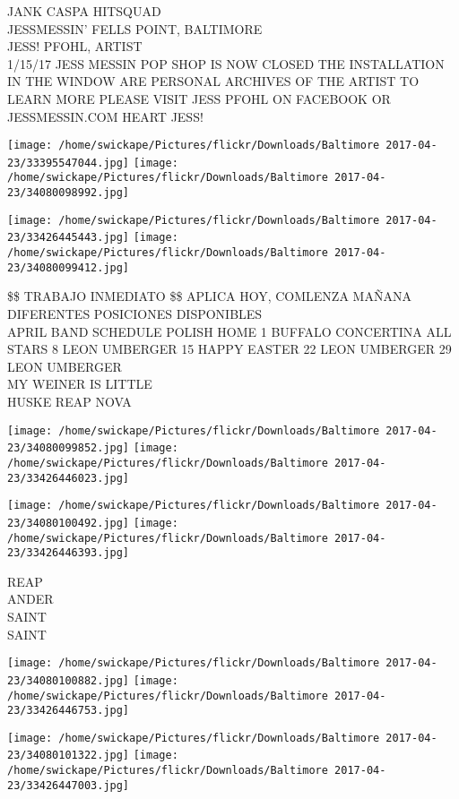 \documentclass[10pt,letterpaper]{article}
\begin{document}
JANK CASPA HITSQUAD\\
JESSMESSIN' FELLS POINT, BALTIMORE\\
JESS! PFOHL, ARTIST\\
1/15/17 JESS MESSIN POP SHOP IS NOW CLOSED THE INSTALLATION IN THE WINDOW ARE PERSONAL ARCHIVES OF THE ARTIST TO LEARN MORE PLEASE VISIT JESS PFOHL ON FACEBOOK OR JESSMESSIN.COM HEART JESS!
\pagebreak

\texttt{[image: /home/swickape/Pictures/flickr/Downloads/Baltimore 2017-04-23/33395547044.jpg]}
\texttt{[image: /home/swickape/Pictures/flickr/Downloads/Baltimore 2017-04-23/34080098992.jpg]}

\texttt{[image: /home/swickape/Pictures/flickr/Downloads/Baltimore 2017-04-23/33426445443.jpg]}
\texttt{[image: /home/swickape/Pictures/flickr/Downloads/Baltimore 2017-04-23/34080099412.jpg]}

\$\$ TRABAJO INMEDIATO \$\$ APLICA HOY, COMLENZA MAÑANA DIFERENTES POSICIONES DISPONIBLES\\
APRIL BAND SCHEDULE POLISH HOME 1 BUFFALO CONCERTINA ALL STARS 8 LEON UMBERGER 15 HAPPY EASTER 22 LEON UMBERGER 29 LEON UMBERGER\\
MY WEINER IS LITTLE\\
HUSKE REAP NOVA
\pagebreak

\texttt{[image: /home/swickape/Pictures/flickr/Downloads/Baltimore 2017-04-23/34080099852.jpg]}
\texttt{[image: /home/swickape/Pictures/flickr/Downloads/Baltimore 2017-04-23/33426446023.jpg]}

\texttt{[image: /home/swickape/Pictures/flickr/Downloads/Baltimore 2017-04-23/34080100492.jpg]}
\texttt{[image: /home/swickape/Pictures/flickr/Downloads/Baltimore 2017-04-23/33426446393.jpg]}

REAP\\
ANDER\\
SAINT\\
SAINT
\pagebreak

\texttt{[image: /home/swickape/Pictures/flickr/Downloads/Baltimore 2017-04-23/34080100882.jpg]}
\texttt{[image: /home/swickape/Pictures/flickr/Downloads/Baltimore 2017-04-23/33426446753.jpg]}

\texttt{[image: /home/swickape/Pictures/flickr/Downloads/Baltimore 2017-04-23/34080101322.jpg]}
\texttt{[image: /home/swickape/Pictures/flickr/Downloads/Baltimore 2017-04-23/33426447003.jpg]}
\end{document}
